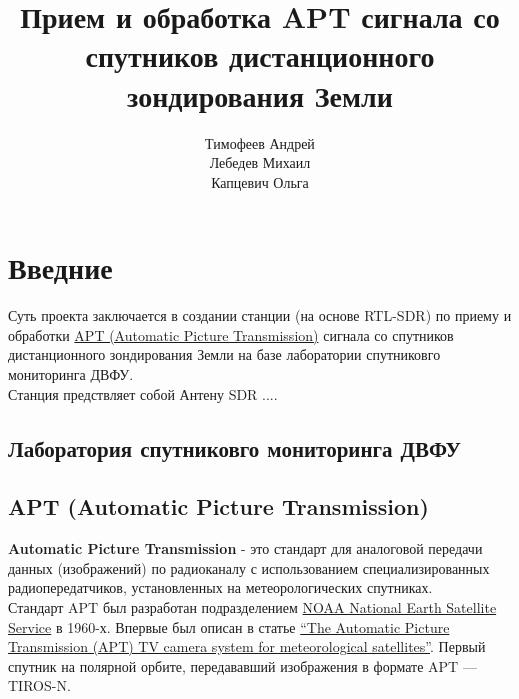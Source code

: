 \documentclass[a4paper, 14pt, titlepage, fleqn]{extarticle}
\begin{document}
	\title{\textbf{Прием и обработка APT сигнала со спутников дистанционного зондирования Земли}}
	\author{Тимофеев Андрей \\ Лебедев Михаил \\ Капцевич Ольга}
	\maketitle
	
	\tableofcontents
	\pagebreak

	\section*{Введние}
	
	Суть проекта заключается в создании станции (на основе RTL-SDR) по приему и обработки \href{https://en.wikipedia.org/wiki/Automatic_picture_transmission}{APT (Automatic Picture Transmission)} сигнала со спутников дистанционного зондирования Земли на базе лаборатории спутниковго мониторинга ДВФУ. \\
	
	\noindent Станция предствляет собой Антену SDR ....
	
	\subsection*{Лаборатория спутниковго мониторинга ДВФУ}
	
	\subsection*{APT (Automatic Picture Transmission)}
	
	\textbf{Automatic Picture Transmission} - это стандарт для аналоговой передачи данных (изображений) по радиоканалу с использованием специализированных радиопередатчиков, установленных на метеорологических спутниках. \\ 
	
	\noindent Стандарт APT был разработан подразделением \href{https://www.noaa.gov/}{NOAA National Earth Satellite Service} в 1960-х. Впервые был описан в статье \href{https://ntrs.nasa.gov/api/citations/19630013799/downloads/19630013799.pdf}{``The Automatic Picture Transmission (APT) TV camera system for meteorological satellites''}. Первый спутник на полярной орбите, передававший изображения в формате APT — TIROS-N.
	
\end{document}
